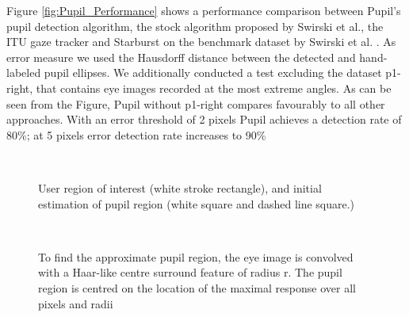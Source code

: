 \documentclass[12pt,fleqn]{book} %
\begin{document}
Figure \ref{fig:Pupil_Performance} shows a performance comparison between Pupil’s pupil detection algorithm, the stock algorithm proposed by Swirski et al., the ITU gaze tracker and Starburst on the benchmark dataset by Swirski et al. \cite{DataSet}. As error measure we used the Hausdorff distance between the detected and hand-labeled pupil ellipses. We additionally conducted a test excluding the dataset p1-right, that contains eye images recorded at the most extreme angles.
As can be seen from the Figure, Pupil without p1-right compares favourably to all other approaches. With an error threshold of 2 pixels Pupil achieves a detection rate of 80\%; at 5 pixels error detection rate increases to 90\%

\begin{figure}[]
\begin{dBox}
\centering
  \mbox{
   }
   \caption{ User region of interest (white stroke rectangle), and initial estimation of pupil region (white square and dashed line square.)
 \label{fig:Pupil Region} }   
\end{dBox}   
\end{figure}


\begin{figure}[]
\begin{dBox}
\centering
  \mbox{
   }
   \caption{ To find the approximate pupil region, the eye image is convolved with a Haar-like centre surround feature of radius r. The pupil region is centred on the location of the maximal response over all pixels and radii
 \label{fig:Estimation pupil region 2} }   
\end{dBox}   
\end{figure}
\end{document}
